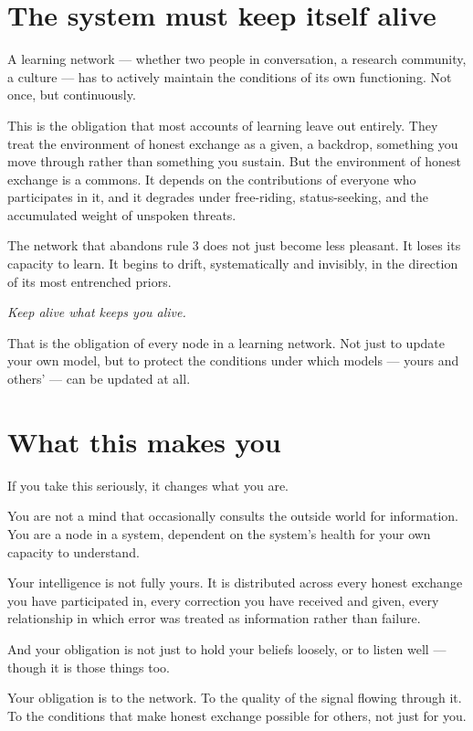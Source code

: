\documentclass{article}
\begin{document}
\section*{The system must keep itself alive}

A learning network --- whether two people in conversation, a research community, a culture --- has to actively maintain the conditions of its own functioning. Not once, but continuously.

This is the obligation that most accounts of learning leave out entirely. They treat the environment of honest exchange as a given, a backdrop, something you move through rather than something you sustain. But the environment of honest exchange is a commons. It depends on the contributions of everyone who participates in it, and it degrades under free-riding, status-seeking, and the accumulated weight of unspoken threats.

The network that abandons rule 3 does not just become less pleasant. It loses its capacity to learn. It begins to drift, systematically and invisibly, in the direction of its most entrenched priors.

\textit{Keep alive what keeps you alive.}

That is the obligation of every node in a learning network. Not just to update your own model, but to protect the conditions under which models --- yours and others' --- can be updated at all.

\section*{What this makes you}

If you take this seriously, it changes what you are.

You are not a mind that occasionally consults the outside world for information. You are a node in a system, dependent on the system's health for your own capacity to understand.

Your intelligence is not fully yours. It is distributed across every honest exchange you have participated in, every correction you have received and given, every relationship in which error was treated as information rather than failure.

And your obligation is not just to hold your beliefs loosely, or to listen well --- though it is those things too.

Your obligation is to the network. To the quality of the signal flowing through it. To the conditions that make honest exchange possible for others, not just for you.
\end{document}

